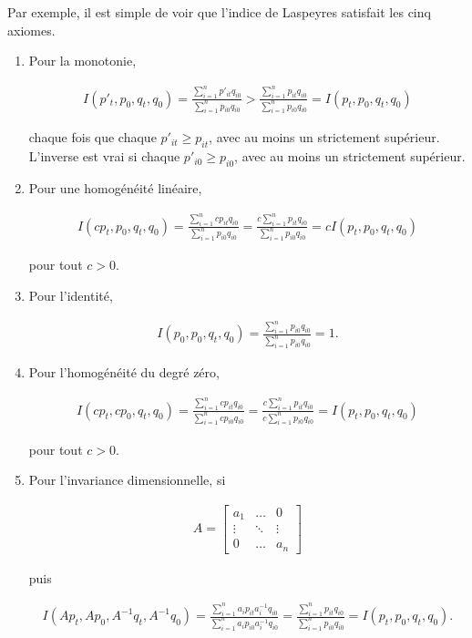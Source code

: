 \documentclass[
]{article}
\begin{document}
Par exemple, il est simple de voir que l'indice de Laspeyres satisfait les cinq axiomes.

\begin{enumerate}
\def\labelenumi{\arabic{enumi}.}
\item
  Pour la monotonie,

  \begin{align*}
  I(p'_{t}, p_{0}, q_{t}, q_{0}) = \frac{\sum_{i = 1}^{n} p'_{it} q_{i0}} {\sum_{i = 1}^{n} p_{i0} q_{i0}}> \frac{\sum_{i = 1}^{n} p_{it} q_{i0}} {\sum_{i = 1}^{n} p_{i0} q_{i0}} = I(p_{t}, p_{0}, q_{t}, q_{0})
   \end{align*}

  chaque fois que chaque \(p'_{it} \geq p_{it}\), avec au moins un strictement supérieur. L'inverse est vrai si chaque \(p'_{i0} \geq p_{i0}\), avec au moins un strictement supérieur.
\item
  Pour une homogénéité linéaire,

  \begin{align*}
  I(cp_{t}, p_{0}, q_{t}, q_{0}) = \frac{\sum_{i = 1}^{n} cp_{it} q_{i0}} {\sum_{i = 1}^{n} p_{i0} q_{i0}} = \frac{c \sum_{i = 1}^{n} p_{it} q_{i0}} {\sum_{i = 1}^{n} p_{i0} q_{i0}} = cI(p_{t}, p_{0}, q_{t}, q_{0})
   \end{align*}

  pour tout \(c> 0\).
\item
  Pour l'identité,

  \begin{align*}
  I(p_{0}, p_{0}, q_{t}, q_{0}) = \frac{\sum_{i = 1}^{n} p_{i0} q_{i0}}{\sum_{i = 1}^{n} p_{i0} q_{i0}} = 1.
   \end{align*}
\item
  Pour l'homogénéité du degré zéro,

  \begin{align*}
  I(cp_{t}, cp_{0}, q_{t}, q_{0}) = \frac{\sum_{i = 1}^{n} cp_{it} q_{i0}} {\sum_{i = 1}^{n} cp_{i0} q_{i0}} = \frac{c \sum_{i = 1}^{n} p_{it} q_{i0}} {c \sum_{i = 1}^{n} p_{i0} q_{i0}} = I(p_{t}, p_{0}, q_{t}, q_{0})
   \end{align*}

  pour tout \(c> 0\).
\item
  Pour l'invariance dimensionnelle, si

  \begin{align*}
  A =
  \begin{bmatrix}
  a_1 & \ldots & 0 \\
  \vdots & \ddots & \vdots \\
  0 & \ldots & a_n
  \end{bmatrix}
   \end{align*}

  puis

  \begin{align*}
  I(Ap_{t}, Ap_{0}, A^{- 1} q_{t}, A^{- 1} q_{0}) = \frac{\sum_{i = 1}^{n} a_{i} p_{it} a_{i}^{- 1} q_{i0}} {\sum_{i = 1}^{n} a_{i} p_{i0} a_{i}^{- 1} q_{i0}} = \frac{\sum_{i = 1}^{n} p_{it} q_{i0}} {\sum_{i = 1}^{n} p_{i0} q_{i0}} = I(p_{t}, p_{0}, q_{t}, q_{0}).
   \end{align*}
\end{enumerate}
\end{document}
